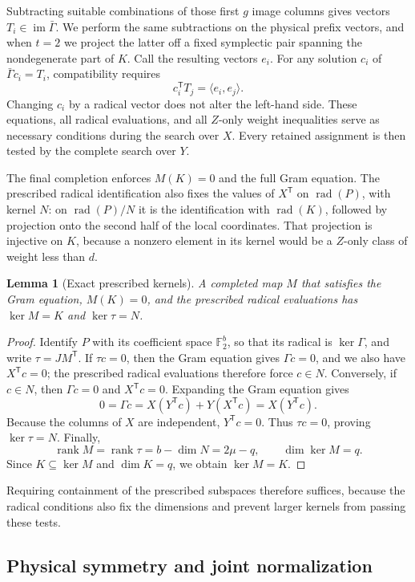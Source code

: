 \documentclass[11pt]{article}
\newtheorem{lemma}[theorem]{Lemma}
\theoremstyle{definition}
\theoremstyle{remark}
\newcommand{\F}{\mathbb F_2}
\newcommand{\rank}{\operatorname{rank}}
\newcommand{\rad}{\operatorname{rad}}
\newcommand{\im}{\operatorname{im}}
\newcommand{\tr}{\mathsf T}
\begin{document}
Subtracting suitable combinations of those first \(g\) image columns
gives vectors \(T_i\in\im\bar\Gamma\). We perform the same subtractions
on the physical prefix vectors, and when \(t=2\) we project the latter
off a fixed symplectic pair spanning the nondegenerate part of \(K\).
Call the resulting vectors \(e_i\). For any solution \(c_i\) of
\(\bar\Gamma c_i=T_i\), compatibility requires
\[
 c_i^\tr T_j=\langle e_i,e_j\rangle.
\]
Changing \(c_i\) by a radical vector does not alter the left-hand side.
These equations, all radical evaluations, and all \(Z\)-only weight
inequalities serve as necessary conditions during the search over \(X\).
Every retained assignment is then tested by the complete search over
\(Y\).

The final completion enforces \(M(K)=0\) and the full Gram equation. The
prescribed radical identification also fixes the values of \(X^\tr\) on
\(\rad(P)\), with kernel \(N\): on \(\rad(P)/N\) it is the
identification with \(\rad(K)\), followed by projection onto the second
half of the local coordinates. That projection is injective on \(K\),
because a nonzero element in its kernel would be a \(Z\)-only class of
weight less than \(d\).

\begin{lemma}[Exact prescribed kernels]\label{lem:fixedkernel}
A completed map \(M\) that satisfies the Gram equation, \(M(K)=0\), and
the prescribed radical evaluations has \(\ker M=K\) and \(\ker\tau=N\).
\end{lemma}
\begin{proof}
Identify \(P\) with its coefficient space \(\F^b\), so that its radical
is \(\ker\Gamma\), and write \(\tau=JM^\tr\). If \(\tau c=0\), then
the Gram equation gives \(\Gamma c=0\), and we also have \(X^\tr c=0\);
the prescribed radical evaluations therefore force \(c\in N\).
Conversely, if \(c\in N\), then \(\Gamma c=0\) and \(X^\tr c=0\).
Expanding the Gram equation gives
\[
 0=\Gamma c=X(Y^\tr c)+Y(X^\tr c)=X(Y^\tr c).
\]
Because the columns of \(X\) are independent, \(Y^\tr c=0\). Thus
\(\tau c=0\), proving \(\ker\tau=N\). Finally,
\[
 \rank M=\rank\tau=b-\dim N=2\mu-q,
 \qquad \dim\ker M=q.
\]
Since \(K\subseteq\ker M\) and \(\dim K=q\), we obtain \(\ker M=K\).
\end{proof}
Requiring containment of the prescribed subspaces therefore suffices,
because the radical conditions also fix the dimensions and prevent
larger kernels from passing these tests.

\subsection{Physical symmetry and joint normalization}\label{sec:symmetry}
\end{document}
